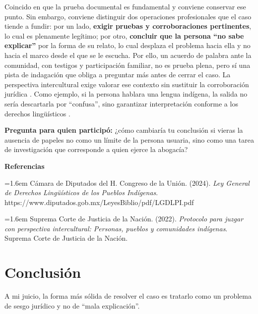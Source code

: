 \documentclass[
  spanish,
  letterpaper, oneside
]{article}
\begin{document}
\begin{forobox}[title={Retroalimentación publicada a otra participación}]
\label{foro-retroalimentacion}

Coincido en que la prueba documental es fundamental y conviene conservar ese punto.
Sin embargo, conviene distinguir dos operaciones profesionales que el caso tiende a fundir: por un lado, \textbf{exigir pruebas y corroboraciones pertinentes}, lo cual es plenamente legítimo; por otro, \textbf{concluir que la persona ``no sabe explicar''} por la forma de su relato, lo cual desplaza el problema hacia ella y no hacia el marco desde el que se le escucha. Por ello, un acuerdo de palabra ante la comunidad, con testigos y participación familiar, no es prueba plena, pero sí una pista de indagación que obliga a preguntar más antes de cerrar el caso. La perspectiva intercultural exige valorar ese contexto sin sustituir la corroboración jurídica \citep{scjn2022protocolo}. Como ejemplo, si la persona hablara una lengua indígena, la salida no sería descartarla por ``confusa'', sino garantizar interpretación conforme a los derechos lingüísticos \citep{leyDerechosLinguisticos2024}.\par
\medskip
\textbf{Pregunta para quien participó:} ¿cómo cambiaría tu conclusión si vieras la ausencia de papeles no como un límite de la persona usuaria, sino como una tarea de investigación que corresponde a quien ejerce la abogacía?
\medskip
\par\noindent\textbf{Referencias}\par
{\setlength{\parskip}{0.35em}%
\par\noindent\hangindent=1.6em Cámara de Diputados del H. Congreso de la Unión. (2024). \textit{Ley General de Derechos Lingüísticos de los Pueblos Indígenas}. https://www.diputados.gob.mx/LeyesBiblio/pdf/LGDLPI.pdf
\par\noindent\hangindent=1.6em Suprema Corte de Justicia de la Nación. (2022). \textit{Protocolo para juzgar con perspectiva intercultural: Personas, pueblos y comunidades indígenas}. Suprema Corte de Justicia de la Nación.
\par}
\end{forobox}

\clearpage
\section{Conclusión}

A mi juicio, la forma más sólida de resolver el caso es tratarlo como un problema de
sesgo jurídico y no de ``mala explicación''.
\end{document}
